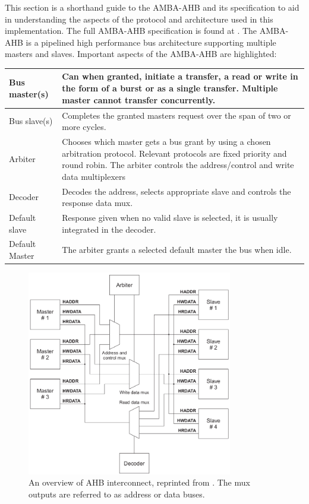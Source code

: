 This section is a shorthand guide to the AMBA-AHB and its specification to aid in understanding the aspects of the protocol and architecture used in this implementation. The full AMBA-AHB specification is found at \cite{amba}. The AMBA-AHB is a pipelined high performance bus architecture supporting multiple masters and slaves. Important aspects of the AMBA-AHB are highlighted:

\begin{tabular}{p{3cm} p{10cm}}
Bus master(s) & Can when granted, initiate a transfer, a read or write in the form of a burst or as a single transfer. Multiple master cannot transfer concurrently. \\
\hline
Bus slave(s) & Completes the granted masters request over the span of two or more cycles. \\
\hline
Arbiter & Chooses which master gets a bus grant by using a chosen arbitration protocol. Relevant protocols are fixed priority and round robin. The arbiter controls the address/control and write data multiplexers \\
\hline
Decoder & Decodes the address, selects appropriate slave and controls the response data mux. \\
\hline
Default slave & Response given when no valid slave is selected, it is usually integrated in the decoder.\\
\hline
Default Master & The arbiter grants a selected default master the bus when idle. \\
\end{tabular}

\newpage

\begin{figure}[hbt]
    \begin{center}
        \includegraphics[width=0.8\textwidth]{figs/AHB/AHB_connections.png}
    \end{center}
    \caption{An overview of AHB interconnect, reprinted from \cite{amba}. The mux outputs are referred to as address or data buses.}
    \label{fig:interc}
\end{figure}


